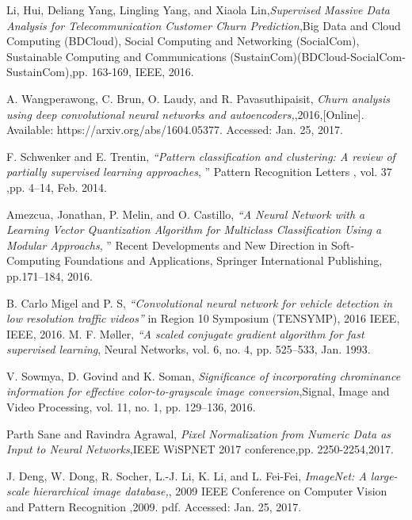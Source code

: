 

{}
\begin{thebibliography}{99}

Li, Hui, Deliang Yang, Lingling Yang, and Xiaola Lin,\emph{Supervised Massive Data Analysis for Telecommunication Customer Churn Prediction},Big Data and Cloud Computing (BDCloud), Social Computing and Networking (SocialCom), Sustainable Computing and Communications (SustainCom)(BDCloud-SocialCom-SustainCom),pp. 163-169, IEEE, 2016.

 A. Wangperawong, C. Brun, O. Laudy, and R. Pavasuthipaisit, \emph{Churn analysis using deep convolutional neural networks and autoencoders,},2016,[Online]. Available: https://arxiv.org/abs/1604.05377.
 Accessed: Jan. 25, 2017.
 
 F. Schwenker and E. Trentin, \emph{“Pattern classification and clustering: A review of partially supervised learning approaches}, ” Pattern Recognition Letters , vol. 37 ,pp. 4–14, Feb. 2014.

Amezcua, Jonathan, P. Melin, and O. Castillo, \emph{“A Neural Network with a Learning Vector Quantization Algorithm for Multiclass Classification Using a Modular Approachs}, ” Recent Developments and New Direction in Soft-Computing Foundations and Applications, Springer International Publishing,  pp.171–184, 2016.

B. Carlo Migel and P. S, \emph{“Convolutional neural network for vehicle detection in low resolution traffic videos”} in Region 10 Symposium (TENSYMP), 2016 IEEE, IEEE, 2016.
M. F. Møller, \emph{“A scaled conjugate gradient algorithm for fast supervised learning}, Neural Networks, vol. 6, no. 4, pp. 525–533, Jan. 1993.

V. Sowmya, D. Govind and K. Soman, \emph{Significance of incorporating chrominance information for effective color-to-grayscale image conversion},Signal, Image and Video Processing, vol. 11, no. 1, pp. 129–136,
2016.

Parth Sane and Ravindra Agrawal, \emph{Pixel Normalization from Numeric Data
	as Input to Neural Networks},IEEE WiSPNET 2017 conference,pp. 2250-2254,2017.

J. Deng, W. Dong, R. Socher, L.-J. Li, K. Li, and L. Fei-Fei, \emph{ImageNet: A large-scale hierarchical image database,}, 2009 IEEE Conference on Computer Vision and Pattern Recognition ,2009.
pdf. Accessed: Jan. 25, 2017.

\end{thebibliography}

